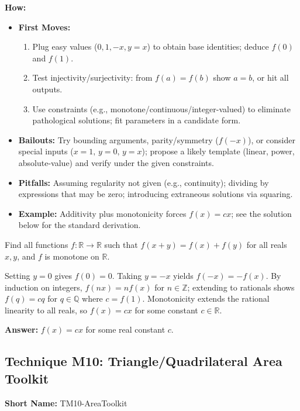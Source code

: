 \documentclass[12pt]{article}
\newenvironment{problem}[1]
{\begin{tcolorbox}[colback=blue!5!white,colframe=blue!75!black,title={#1}]}{\end{tcolorbox}}
\newenvironment{solution}
{\begin{tcolorbox}[colback=green!5!white,colframe=green!75!black,title={Solution}]}{\end{tcolorbox}}
\begin{document}
\textbf{How:}
\begin{itemize}
    \item \textbf{First Moves:}
    \begin{enumerate}[nosep]
        \item Plug easy values ($0,1,-x,y=x$) to obtain base identities; deduce $f(0)$ and $f(1)$.
        \item Test injectivity/surjectivity: from $f(a)=f(b)$ show $a=b$, or hit all outputs.
        \item Use constraints (e.g., monotone/continuous/integer-valued) to eliminate pathological solutions; fit parameters in a candidate form.
    \end{enumerate}
    \item \textbf{Bailouts:} Try bounding arguments, parity/symmetry ($f(-x)$), or consider special inputs ($x=1,\,y=0,\,y=x$); propose a likely template (linear, power, absolute-value) and verify under the given constraints.
    \item \textbf{Pitfalls:} Assuming regularity not given (e.g., continuity); dividing by expressions that may be zero; introducing extraneous solutions via squaring.
    \item \textbf{Example:} Additivity plus monotonicity forces $f(x)=cx$; see the solution below for the standard derivation.
\end{itemize}

\begin{problem}{Example: Additive Form under Monotonicity}
Find all functions $f:\mathbb{R}\to\mathbb{R}$ such that $f(x+y)=f(x)+f(y)$ for all reals $x,y$, and $f$ is monotone on $\mathbb{R}$.
\end{problem}

\begin{solution}
Setting $y=0$ gives $f(0)=0$. Taking $y=-x$ yields $f(-x)=-f(x)$. By induction on integers, $f(nx)=nf(x)$ for $n\in\mathbb{Z}$; extending to rationals shows $f(q)=cq$ for $q\in\mathbb{Q}$ where $c=f(1)$. Monotonicity extends the rational linearity to all reals, so $f(x)=cx$ for some constant $c\in\mathbb{R}$.

\textbf{Answer:} $f(x)=cx$ for some real constant $c$.
\end{solution}

\subsection{Technique M10: Triangle/Quadrilateral Area Toolkit}
\textbf{Short Name:} TM10-AreaToolkit
\end{document}
